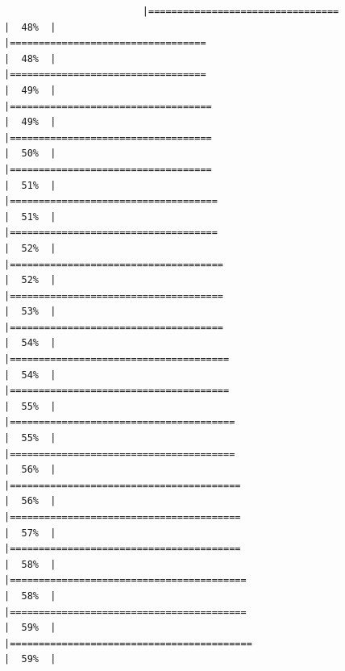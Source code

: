 \documentclass[
  ignorenonframetext,
]{beamer}
\begin{document}
\begin{frame}[fragile]{}
\begin{verbatim}
                        |=================================                                     |  48%  |                                                                              |==================================                                    |  48%  |                                                                              |==================================                                    |  49%  |                                                                              |===================================                                   |  49%  |                                                                              |===================================                                   |  50%  |                                                                              |===================================                                   |  51%  |                                                                              |====================================                                  |  51%  |                                                                              |====================================                                  |  52%  |                                                                              |=====================================                                 |  52%  |                                                                              |=====================================                                 |  53%  |                                                                              |=====================================                                 |  54%  |                                                                              |======================================                                |  54%  |                                                                              |======================================                                |  55%  |                                                                              |=======================================                               |  55%  |                                                                              |=======================================                               |  56%  |                                                                              |========================================                              |  56%  |                                                                              |========================================                              |  57%  |                                                                              |========================================                              |  58%  |                                                                              |=========================================                             |  58%  |                                                                              |=========================================                             |  59%  |                                                                              |==========================================                            |  59%  |                              
\end{verbatim}
\end{frame}
\end{document}
